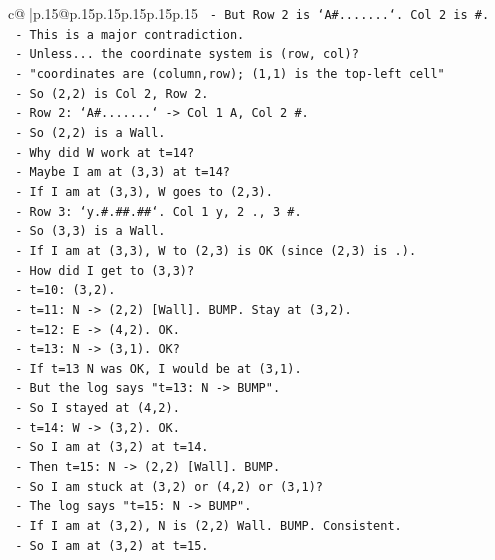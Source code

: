 \documentclass{article}
\begin{document}
{\begin{supertabular}{c@{$\;$}|p{.15\linewidth}@{}p{.15\linewidth}p{.15\linewidth}p{.15\linewidth}p{.15\linewidth}p{.15\linewidth}}
{{{\texttt{    {-} But Row 2 is `A\#.......`. Col 2 is \#.} \\
\texttt{    {-} This is a major contradiction.} \\
\texttt{    {-} Unless... the coordinate system is (row, col)?} \\
\texttt{    {-} "coordinates are (column,row); (1,1) is the top{-}left cell"} \\
\texttt{    {-} So (2,2) is Col 2, Row 2.} \\
\texttt{    {-} Row 2: `A\#.......` {-}> Col 1 A, Col 2 \#.} \\
\texttt{    {-} So (2,2) is a Wall.} \\
\texttt{    {-} Why did W work at t=14?} \\
\texttt{    {-} Maybe I am at (3,3) at t=14?} \\
\texttt{    {-} If I am at (3,3), W goes to (2,3).} \\
\texttt{    {-} Row 3: `y.\#.\#\#.\#\#`. Col 1 y, 2 ., 3 \#.} \\
\texttt{    {-} So (3,3) is a Wall.} \\
\texttt{    {-} If I am at (3,3), W to (2,3) is OK (since (2,3) is .).} \\
\texttt{    {-} How did I get to (3,3)?} \\
\texttt{    {-} t=10: (3,2).} \\
\texttt{    {-} t=11: N {-}> (2,2) {[}Wall{]}. BUMP. Stay at (3,2).} \\
\texttt{    {-} t=12: E {-}> (4,2). OK.} \\
\texttt{    {-} t=13: N {-}> (3,1). OK?} \\
\texttt{    {-} If t=13 N was OK, I would be at (3,1).} \\
\texttt{    {-} But the log says "t=13: N {-}> BUMP".} \\
\texttt{    {-} So I stayed at (4,2).} \\
\texttt{    {-} t=14: W {-}> (3,2). OK.} \\
\texttt{    {-} So I am at (3,2) at t=14.} \\
\texttt{    {-} Then t=15: N {-}> (2,2) {[}Wall{]}. BUMP.} \\
\texttt{    {-} So I am stuck at (3,2) or (4,2) or (3,1)?} \\
\texttt{    {-} The log says "t=15: N {-}> BUMP".} \\
\texttt{    {-} If I am at (3,2), N is (2,2) Wall. BUMP. Consistent.} \\
\texttt{    {-} So I am at (3,2) at t=15.} \\
}}}
\end{supertabular}}
\end{document}
